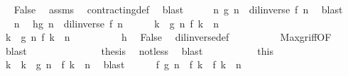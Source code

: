\begin{isabellebody}
\ \isamarkupfalse%
\ False\ \isamarkupfalse%
\ assms{\isacharparenleft}{}{\isacharparenright}\ \isamarkupfalse%
\ contracting{\isacharunderscore}def\ \isamarkupfalse%
\ blast\isanewline
\ \ \isacommand{{\isacharbraceright}}\isamarkupfalse%
\ \isamarkupfalse%
\ {}{\isacharcolon}{\isacartoucheopen}{\isasymAnd}n{\isachardot}\ {\isasymnot}{\isacharparenleft}g\ n\ {\isacharless}\ {\isacharparenleft}dil{\isacharunderscore}inverse\ f{\isacharparenright}\ n{\isacharparenright}{\isacartoucheclose}\ \isamarkupfalse%
\ blast\isanewline
\ \ \isacommand{{\isacharbraceleft}}\isamarkupfalse%
\ \isamarkupfalse%
\ n\ \isamarkupfalse%
\ h{\isacharcolon}{\isacartoucheopen}g\ n\ {\isachargreater}\ {\isacharparenleft}dil{\isacharunderscore}inverse\ f{\isacharparenright}\ n{\isacartoucheclose}\isanewline
\ \ \ \ \isamarkupfalse%
\ {\isacartoucheopen}{\isasymexists}k\ {\isasymle}\ g\ n{\isachardot}\ f\ k\ {\isachargreater}\ n{\isacartoucheclose}\ \isanewline
\ \ \ \ \isamarkupfalse%
\ {\isacharminus}\isanewline
\ \ \ \ \ \ \isacommand{{\isacharbraceleft}}\isamarkupfalse%
\ \isamarkupfalse%
\ {\isacartoucheopen}{\isasymforall}k\ {\isasymle}\ g\ n{\isachardot}\ f\ k\ {\isasymle}\ n{\isacartoucheclose}\isanewline
\ \ \ \ \ \ \ \ \isamarkupfalse%
\ h\ \isamarkupfalse%
\ False\ \isamarkupfalse%
\ dil{\isacharunderscore}inverse{\isacharunderscore}def\isanewline
\ \ \ \ \ \ \ \ \isamarkupfalse%
\ Max{\isacharunderscore}gr{\isacharunderscore}iff{\isacharbrackleft}OF\ {\isacharasterisk}\ {\isacharasterisk}{\isacharasterisk}{\isacharbrackright}\ \isamarkupfalse%
\ blast\isanewline
\ \ \ \ \ \ \isacommand{{\isacharbraceright}}\isamarkupfalse%
\isanewline
\ \ \ \ \ \ \isamarkupfalse%
\ {\isacharquery}thesis\ \isamarkupfalse%
\ not{\isacharunderscore}less\ \isamarkupfalse%
\ blast\isanewline
\ \ \ \ \isamarkupfalse%
\isanewline
\ \ \ \ \isamarkupfalse%
\ this\ \isamarkupfalse%
\ k\ \ {\isacartoucheopen}k\ {\isasymle}\ g\ n\ {\isasymand}\ f\ k\ {\isachargreater}\ n{\isacartoucheclose}\ \isamarkupfalse%
\ blast\isanewline
\ \ \ \ \isamarkupfalse%
\ {\isacartoucheopen}f\ {\isacharparenleft}g\ n{\isacharparenright}\ {\isasymge}\ f\ k\ {\isasymand}\ f\ k\ {\isachargreater}\ n{\isacartoucheclose}\ \isamarkupfalse%

\end{isabellebody}
